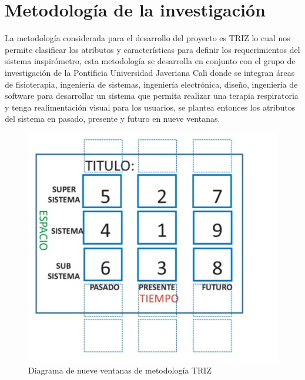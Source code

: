 \documentclass[12pt]{article}
\begin{document}










\section{Metodología de la investigación}

La metodología considerada para el desarrollo del proyecto es TRIZ lo cual nos permite clasificar los atributos y características para definir los requerimientos del sistema inspirómetro, esta metodología se desarrolla en conjunto con el grupo de investigación de la Pontificia Universidad Javeriana Cali donde se integran áreas de fisioterapia, ingeniería de sistemas, ingeniería electrónica, diseño, ingeniería de software para desarrollar un sistema que permita realizar una terapia respiratoria y tenga realimentación visual para los usuarios, se plantea entonces los atributos del sistema en pasado, presente y futuro en nueve ventanas.

\begin{figure}[ht]
\centering
\includegraphics[scale=0.45]{imag/9ventanas.png}
\caption{Diagrama de nueve ventanas de metodología TRIZ }
\label{4}
\end{figure}
\FloatBarrier
\end{document}
